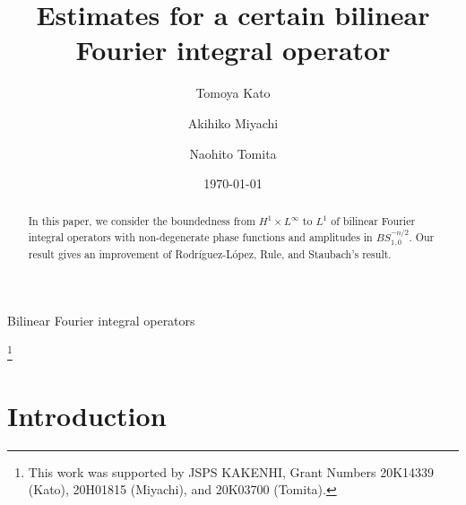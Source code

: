 \documentclass[12pt]{amsart}
\numberwithin{equation}{section}
\theoremstyle{plain}
\theoremstyle{definition}
\begin{document}


\title[Bilinear Fourier integral operators]
{Estimates for a certain bilinear Fourier integral operator} 

\author[T. Kato]{Tomoya Kato}
\author[A. Miyachi]{Akihiko Miyachi}
\author[N. Tomita]{Naohito Tomita}

\address[T. Kato]
{Division of Pure and Applied Science, 
Faculty of Science and Technology, Gunma University, 
Kiryu, Gunma 376-8515, Japan}

\address[A. Miyachi]
{Department of Mathematics, 
Tokyo Woman's Christian University, 
Zempukuji, Suginami-ku, Tokyo 167-8585, Japan}

\address[N. Tomita]
{Department of Mathematics, 
Graduate School of Science, Osaka University, 
Toyonaka, Osaka 560-0043, Japan}


\date{\today}

\keywords
{Bilinear Fourier integral operators}

\thanks
{This work was supported by JSPS KAKENHI, 
Grant Numbers 
20K14339 (Kato), 
20H01815 (Miyachi), and 
20K03700 (Tomita).}



\begin{abstract}
In this paper,
we consider the boundedness
from $H^{1} \times L^{\infty}$ to $L^{1}$ of
bilinear Fourier integral operators
with non-degenerate phase functions and 
amplitudes in $BS_{1,0}^{-n/2}$.
Our result gives an improvement of
Rodr\'iguez-L\'opez, Rule, and Staubach's result.
\end{abstract}

\maketitle

\section{Introduction}\label{intro}
\end{document}
